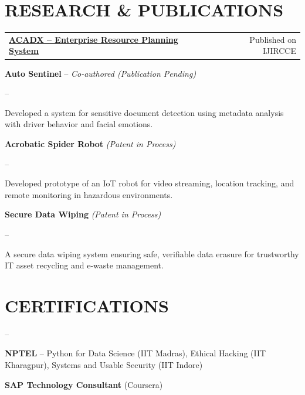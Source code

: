 \documentclass[9pt,a4paper]{extarticle}
\newenvironment{dashlist}{%
\begin{list}{--}{%
\setlength{\leftmargin}{1.1em}
\setlength{\itemsep}{0pt}
\setlength{\parsep}{0pt}
\setlength{\topsep}{0pt}
\setlength{\labelsep}{0.3em}
}}{\end{list}}
\begin{document}
{{%
\section{RESEARCH \& PUBLICATIONS}

\noindent
\begin{tabularx}{\linewidth}{@{} X r @{}}
\textbf{\href{https://ijircce.com/admin/main/storage/app/pdf/NFeWUCxFGWKnEKH0UdJMokxx8BUEL5Bn3IK2BPB6.pdf}{\underline{ACADX -- Enterprise Resource Planning System}}} & Published on IJIRCCE \\
\end{tabularx}

\noindent\textbf{Auto Sentinel} -- \hfill \textit{Co-authored (Publication Pending)}
\begin{dashlist}
\item Developed a system for sensitive document detection using metadata analysis with driver behavior and facial emotions.
\end{dashlist}

\noindent\textbf{Acrobatic Spider Robot} \hfill \textit{(Patent in Process)}
\begin{dashlist}
\item Developed prototype of an IoT robot for video streaming, location tracking, and remote monitoring in hazardous environments.
\end{dashlist}

\noindent\textbf{Secure Data Wiping} \hfill \textit{(Patent in Process)}
\begin{dashlist}
\item A secure data wiping system ensuring safe, verifiable data erasure for trustworthy IT asset recycling and e-waste management.
\end{dashlist}

\section{CERTIFICATIONS}

\begin{dashlist}
\item \textbf{NPTEL} -- Python for Data Science (IIT Madras), Ethical Hacking (IIT Kharagpur), Systems and Usable Security (IIT Indore)
\item \textbf{SAP Technology Consultant} (Coursera)
\end{dashlist}
\end{document}
